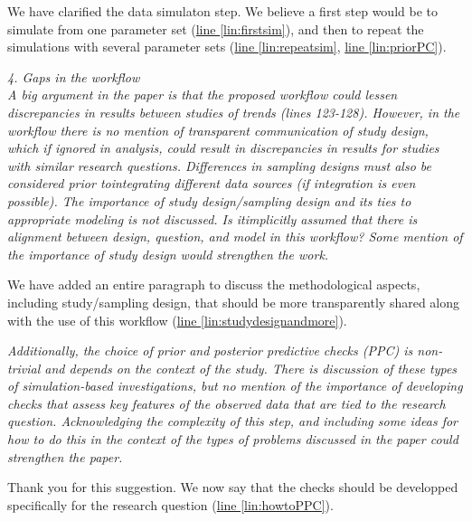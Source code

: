 \documentclass[11pt,letter]{article}
\begin{document}
We have clarified the data simulaton step. We believe a first step would be to simulate from one parameter set (\href{file:forecastflows_r1\#lintarget:firstsim}{line \ref*{lin:firstsim}}), and then to repeat the simulations with several parameter sets (\href{file:forecastflows_r1\#lintarget:repeatsim}{line \ref*{lin:repeatsim}}, \href{file:forecastflows_r1\#lintarget:priorPC}{line \ref*{lin:priorPC}}).

\begin{mybox}
\emph{4. Gaps in the workflow\\
A big argument in the paper is that the proposed workflow could lessen discrepancies in results between studies of trends (lines 123-128). However, in the workflow there is no mention of transparent communication of study design, which if ignored in analysis, could result in discrepancies in results for studies with similar research questions. Differences in sampling designs must also be considered prior tointegrating different data sources (if integration is even possible). The importance of study design/sampling design and its ties to appropriate modeling is not discussed. Is itimplicitly assumed that there is alignment between design, question, and model in this workflow? Some mention of the importance of study design would strengthen the work.}
\end{mybox}

We have added an entire paragraph to discuss the methodological aspects, including study/sampling design, that should be more transparently shared along with the use of this workflow (\href{file:forecastflows_r1\#lintarget:studydesignandmore}{line \ref*{lin:studydesignandmore}}).

\begin{mybox}
\emph{Additionally, the choice of prior and posterior predictive checks (PPC) is non-trivial and depends on the context of the study. There is discussion of these types of simulation-based investigations, but no mention of the importance of developing checks that assess key features of the observed data that are tied to the research question. Acknowledging the complexity of this step, and including some ideas for how to do this in the context of the types of problems discussed in the paper could strengthen the paper.}
\end{mybox}

Thank you for this suggestion. We now say that the checks should be developped specifically for the research question (\href{file:forecastflows_r1\#lintarget:howtoPPC}{line \ref*{lin:howtoPPC}}). 
\end{document}
